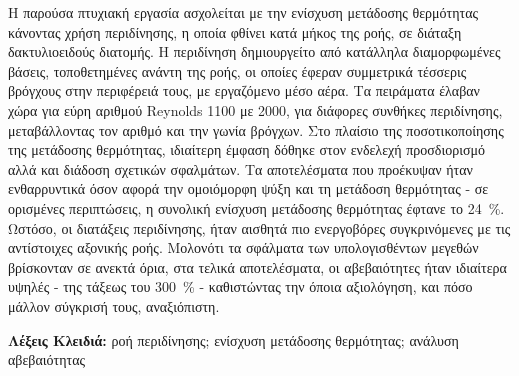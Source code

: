 
\newcommand*{\keywordsgr}[1]{\vspace{1cm}\noindent\textbf{Λέξεις Κλειδιά:} #1}

\begin{abstract-greek}

\noindent Η παρούσα πτυχιακή εργασία ασχολείται με την ενίσχυση μετάδοσης θερμότητας κάνοντας χρήση περιδίνησης, η οποία φθίνει κατά μήκος της ροής, σε διάταξη δακτυλιοειδούς διατομής. Η περιδίνηση δημιουργείτο από κατάλληλα διαμορφωμένες βάσεις, τοποθετημένες ανάντη της ροής, οι οποίες έφεραν συμμετρικά τέσσερις βρόγχους στην περιφέρειά τους, με εργαζόμενο μέσο αέρα. Τα πειράματα έλαβαν χώρα για εύρη αριθμού Reynolds 1100 με 2000, για διάφορες συνθήκες περιδίνησης, μεταβάλλοντας τον αριθμό και την γωνία βρόγχων. Στο πλαίσιο της ποσοτικοποίησης της μετάδοσης θερμότητας, ιδιαίτερη έμφαση δόθηκε στον ενδελεχή προσδιορισμό αλλά και διάδοση σχετικών σφαλμάτων. Τα αποτελέσματα που προέκυψαν ήταν ενθαρρυντικά όσον αφορά την ομοιόμορφη ψύξη και τη μετάδοση θερμότητας - σε ορισμένες περιπτώσεις, η συνολική ενίσχυση μετάδοσης θερμότητας έφτανε το \qty{24}{\percent}. Ωστόσο, οι διατάξεις περιδίνησης, ήταν αισθητά πιο ενεργοβόρες συγκρινόμενες με τις αντίστοιχες αξονικής ροής. Μολονότι τα σφάλματα των υπολογισθέντων μεγεθών βρίσκονταν σε ανεκτά όρια, στα τελικά αποτελέσματα, οι αβεβαιότητες ήταν ιδιαίτερα υψηλές - της τάξεως του \qty{300}{\percent} - καθιστώντας την όποια αξιολόγηση, και πόσο μάλλον σύγκρισή τους, αναξιόπιστη.

\keywordsgr{ροή περιδίνησης; ενίσχυση μετάδοσης θερμότητας; ανάλυση αβεβαιότητας}

\end{abstract-greek}
